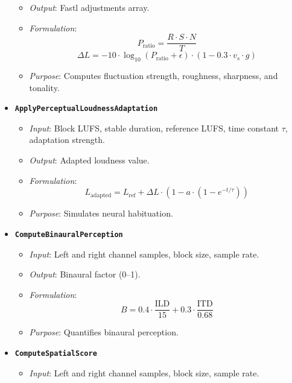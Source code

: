\documentclass[11pt]{article}
\begin{document}
\begin{itemize}[label=$\bullet$]
\begin{itemize}
      \item \textit{Output}: Fastl adjustments array.
      \item \textit{Formulation}:
        \begin{equation}
        P_{\text{ratio}} = \frac{R \cdot S \cdot N}{T}
        \end{equation}
        \begin{equation}
        \Delta L = -10 \cdot \log_{10}(P_{\text{ratio}} + \epsilon) \cdot (1 - 0.3 \cdot v_s \cdot g)
        \end{equation}
      \item \textit{Purpose}: Computes fluctuation strength, roughness, sharpness, and tonality.
    \end{itemize}
  \item \textbf{\texttt{ApplyPerceptualLoudnessAdaptation}}
    \begin{itemize}
      \item \textit{Input}: Block LUFS, stable duration, reference LUFS, time constant $\tau$, adaptation strength.
      \item \textit{Output}: Adapted loudness value.
      \item \textit{Formulation}:
        \begin{equation}
        L_{\text{adapted}} = L_{\text{ref}} + \Delta L \cdot (1 - a \cdot (1 - e^{-t/\tau}))
        \end{equation}
      \item \textit{Purpose}: Simulates neural habituation.
    \end{itemize}
  \item \textbf{\texttt{ComputeBinauralPerception}}
    \begin{itemize}
      \item \textit{Input}: Left and right channel samples, block size, sample rate.
      \item \textit{Output}: Binaural factor (0--1).
      \item \textit{Formulation}:
        \begin{equation}
        B = 0.4 \cdot \frac{\text{ILD}}{15} + 0.3 \cdot \frac{\text{ITD}}{0.68}
        \end{equation}
      \item \textit{Purpose}: Quantifies binaural perception.
    \end{itemize}
  \item \textbf{\texttt{ComputeSpatialScore}}
    \begin{itemize}
      \item \textit{Input}: Left and right channel samples, block size, sample rate.

\end{itemize}
\end{itemize}
\end{document}
